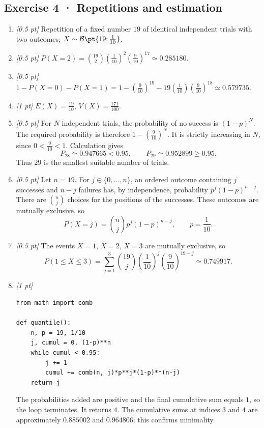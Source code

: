 \subsection*{Exercise 4 · Repetitions and estimation}\begin{enumerate}

\item \textit{[0.5 pt]} Repetition of a fixed number $19$ of identical independent trials with two outcomes; $X\sim\mathcal B\pt{19;\frac{1}{10}}$.

\item \textit{[0.5 pt]} $P(X=2)=\binom{19}2(\frac{1}{10})^2(\frac{9}{10})^{17}\simeq\num{0,285180}$.

\item \textit{[0.5 pt]} $1-P(X=0)-P(X=1)=1-(\frac{9}{10})^{19}-19(\frac{1}{10})(\frac{9}{10})^{18}\simeq\num{0,579735}$.

\item \textit{[1 pt]} $E(X)=\frac{19}{10}$, $V(X)=\frac{171}{100}$.

\item \textit{[0.5 pt]} For $N$ independent trials, the probability of no success is $(1-p)^N$. The required probability is therefore $1-(\frac{9}{10})^N$. It is strictly increasing in $N$, since $0<\frac{9}{10}<1$. Calculation gives
\[P_{28}\simeq\num{0,947665}<\num{0,95},\qquad P_{29}\simeq\num{0,952899}\ge\num{0,95}.\]
Thus $29$ is the smallest suitable number of trials.

\item \textit{[0.5 pt]} Let $n=19$. For $j\in\{0,\ldots,n\}$, an ordered outcome containing $j$ successes and $n-j$ failures has, by independence, probability $p^j(1-p)^{n-j}$. There are $\binom nj$ choices for the positions of the successes. These outcomes are mutually exclusive, so
\[P(X=j)=\binom nj p^j(1-p)^{n-j},\qquad p=\frac{1}{10}.\]

\item \textit{[0.5 pt]} The events $X=1$, $X=2$, $X=3$ are mutually exclusive, so
\[P(1\le X\le3)=\sum_{j=1}^3\binom{19}j(\frac{1}{10})^j(\frac{9}{10})^{19-j}\simeq\num{0,749917}.\]


\item \textit{[1 pt]} 
\begin{lstlisting}
from math import comb

def quantile():
    n, p = 19, 1/10
    j, cumul = 0, (1-p)**n
    while cumul < 0.95:
        j += 1
        cumul += comb(n, j)*p**j*(1-p)**(n-j)
    return j
\end{lstlisting}
The probabilities added are positive and the final cumulative sum equals $1$, so the loop terminates. It returns $4$. The cumulative sums at indices $3$ and $4$ are approximately $\num{0,885002}$ and $\num{0,964806}$: this confirms minimality.

\end{enumerate}

\fi

\fi


